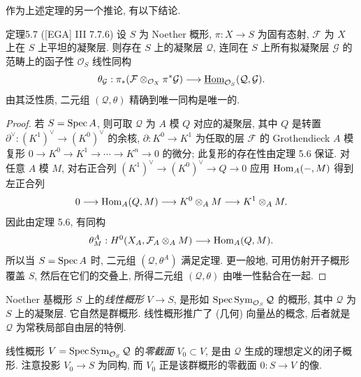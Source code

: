 作为上述定理的另一个推论, 有以下结论.
\begin{origstatement}{定理}{5.7}\label{ch05:thm5.7}
([EGA] III 7.7.6) 设 $S$ 为 Noether 概形, $\pi:X\to S$ 为固有态射, $\mathcal F$ 为 $X$ 上在 $S$ 上平坦的凝聚层. 则存在 $S$ 上的凝聚层 $\mathcal Q$, 连同在 $S$ 上所有拟凝聚层 $\mathcal G$ 的范畴上的函子性 $\mathcal O_S$ 线性同构
\[
 \theta_{\mathcal G}:\pi_*(\mathcal F\otimes_{\mathcal O_X}\pi^*\mathcal G)
 \longrightarrow\underline{\operatorname{Hom}}_{\mathcal O_S}(\mathcal Q,\mathcal G).
\]
由其泛性质, 二元组 $(\mathcal Q,\theta)$ 精确到唯一同构是唯一的.
\end{origstatement}
\begin{proof}
若 $S=\operatorname{Spec} A$, 则可取 $\mathcal Q$ 为 $A$ 模 $Q$ 对应的凝聚层, 其中 $Q$ 是转置 $\partial^\vee:(K^1)^\vee\to(K^0)^\vee$ 的余核, $\partial:K^0\to K^1$ 为任取的层 $\mathcal F$ 的 Grothendieck $A$ 模复形 $0\to K^0\to K^1\to\cdots\to K^n\to0$ 的微分; 此复形的存在性由定理 5.6 保证. 对任意 $A$ 模 $M$, 对右正合列 $(K^1)^\vee\to(K^0)^\vee\to Q\to0$ 应用 $\operatorname{Hom}_A(-,M)$ 得到左正合列
\[
 0\longrightarrow\operatorname{Hom}_A(Q,M)\longrightarrow K^0\otimes_A M\longrightarrow K^1\otimes_A M.
\]
因此由定理 5.6, 有同构
\[
 \theta^A_M:H^0(X_A,\mathcal F_A\otimes_A M)\longrightarrow\operatorname{Hom}_A(Q,M).
\]
所以当 $S=\operatorname{Spec} A$ 时, 二元组 $(\mathcal Q,\theta^A)$ 满足定理. 更一般地, 可用仿射开子概形覆盖 $S$, 然后在它们的交叠上, 所得二元组 $(\mathcal Q,\theta)$ 由唯一性黏合在一起.
\end{proof}

Noether 基概形 $S$ 上的\emph{线性概形} $V\to S$, 是形如 $\operatorname{Spec}\operatorname{Sym}_{\mathcal O_S}\mathcal Q$ 的概形, 其中 $\mathcal Q$ 为 $S$ 上的凝聚层. 它自然是群概形. 线性概形推广了 (几何) 向量丛的概念, 后者就是 $\mathcal Q$ 为常秩局部自由层的特例.

线性概形 $V=\operatorname{Spec}\operatorname{Sym}_{\mathcal O_S}\mathcal Q$ 的\emph{零截面} $V_0\subset V$, 是由 $\mathcal Q$ 生成的理想定义的闭子概形. 注意投影 $V_0\to S$ 为同构, 而 $V_0$ 正是该群概形的零截面 $0:S\to V$ 的像.

